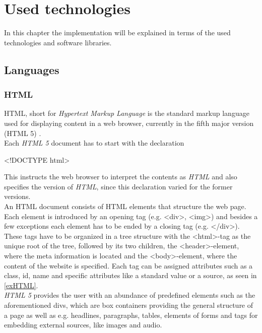 
\chapter{Used technologies}
  \label{technologies}

In this chapter the implementation will be explained in terms of the used technologies and software libraries.
\section{Languages}
\subsection{HTML}
HTML, short for \textit{Hypertext Markup Language} is the standard markup language used for displaying content in a web browser, currently in the fifth major version (HTML 5) \cite{hogan_2011,w3c,wiki-html}.\\
Each \textit{HTML 5} document has to start with the declaration 
\begin{center}
\textless !DOCTYPE html\textgreater
\end{center}
This instructs the web browser to interpret the contents as \textit{HTML} and also specifies the version of \textit{HTML}, since this declaration varied for the former versions.\\
An HTML document consists of HTML elements that structure the web page. Each element is introduced by an opening tag (e.g. \textless div\textgreater, \textless img\textgreater) and besides a few exceptions each element has to be ended by a closing tag (e.g. \textless /div\textgreater). These tags have to be organized in a tree structure with the \textless html\textgreater-tag as the unique root of the tree, followed by its two children, the \textless header\textgreater-element, where the meta information is located and the \textless body\textgreater-element, where the content of the website is specified. Each tag can be assigned attributes such as a class, id, name and specific attributes like a standard value or a source, as seen in \autoref{exHTML}.\\
\textit{HTML 5} provides the user with an abundance of predefined elements such as the aforementioned divs, which are box containers providing the general structure of a page as well as e.g. headlines, paragraphs, tables, elements of forms and tags for embedding external sources, like images and audio.\\
